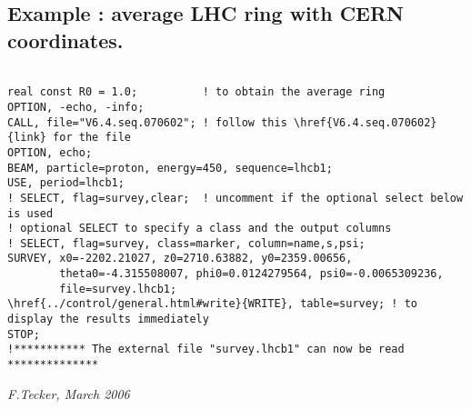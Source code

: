 \subsection{ Example : average LHC ring with CERN coordinates.}
\begin{verbatim}

real const R0 = 1.0;          ! to obtain the average ring
OPTION, -echo, -info;
CALL, file="V6.4.seq.070602"; ! follow this \href{V6.4.seq.070602}{link} for the file
OPTION, echo;
BEAM, particle=proton, energy=450, sequence=lhcb1;
USE, period=lhcb1;
! SELECT, flag=survey,clear;  ! uncomment if the optional select below is used
! optional SELECT to specify a class and the output columns
! SELECT, flag=survey, class=marker, column=name,s,psi;
SURVEY, x0=-2202.21027, z0=2710.63882, y0=2359.00656,
        theta0=-4.315508007, phi0=0.0124279564, psi0=-0.0065309236,
        file=survey.lhcb1;
\href{../control/general.html#write}{WRITE}, table=survey; ! to display the results immediately
STOP;
!*********** The external file "survey.lhcb1" can now be read **************
\end{verbatim}\textit{F.Tecker, March 2006}

